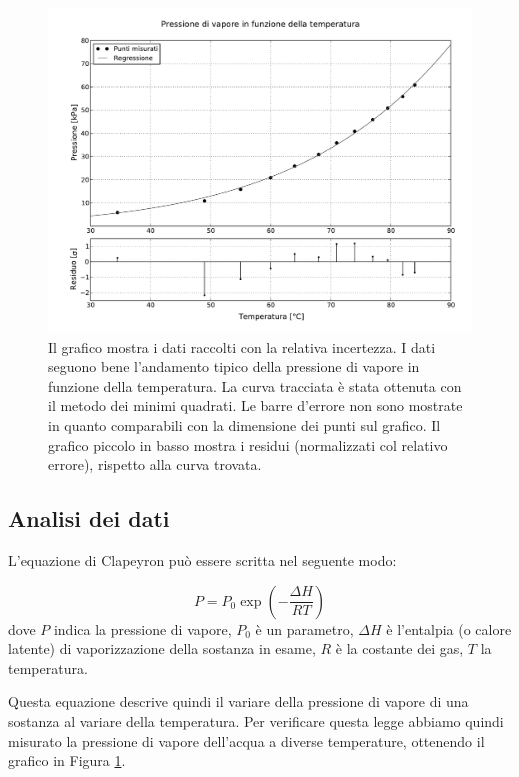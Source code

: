 \begin{figure}[h!]
    \includegraphics[width=16cm]{graph.pdf}
    \caption{Il grafico mostra i dati raccolti con la relativa incertezza. I dati seguono bene
    l'andamento tipico della pressione di vapore in funzione della temperatura.
    La curva tracciata è stata ottenuta con il metodo dei minimi quadrati. Le barre d'errore non sono
    mostrate in quanto comparabili con la dimensione dei punti sul grafico. Il grafico piccolo in basso
    mostra i residui (normalizzati col relativo errore), rispetto alla curva trovata.}
    \label{fig:graph}
\end{figure}


\subsection{Analisi dei dati}

L'equazione di Clapeyron può essere scritta nel seguente modo:

\begin{equation}
    P = P_0 \exp \left( - \frac{\Delta H}{RT} \right)
    \label{eq:clap}
\end{equation}
%
dove $P$ indica la pressione di vapore, $P_0$ è un parametro, $\Delta H$ è l'entalpia
(o calore latente) di vaporizzazione della sostanza in esame, $R$ è la costante dei gas, $T$ la temperatura.

Questa equazione descrive quindi il variare della pressione di vapore di una sostanza al variare della temperatura.
Per verificare questa legge abbiamo quindi misurato la pressione di vapore dell'acqua a diverse temperature,
ottenendo il grafico in Figura \ref{fig:graph}. 

